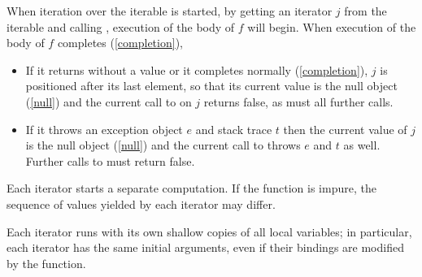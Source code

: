 \documentclass[makeidx]{article}
\begin{document}
\LMHash{}%
When iteration over the iterable is started, by getting an iterator $j$ from the iterable and calling , execution of the body of $f$ will begin.
When execution of the body of $f$ completes (\ref{completion}),
\begin{itemize}
\item If it returns without a value or it completes normally (\ref{completion}), $j$ is positioned after its last element, so that its current value is the null object (\ref{null}) and the current call to  on $j$ returns false, as must all further calls.
\item If it throws an exception object $e$ and stack trace $t$ then the current value of $j$ is the null object (\ref{null}) and the current call to  throws $e$ and $t$ as well.
Further calls to  must return false.
\end{itemize}

Each iterator starts a separate computation.
If the \code{\SYNC*} function is impure, the sequence of values yielded by each iterator may differ.


\LMHash{}%
Each iterator runs with its own shallow copies of all local variables; in particular, each iterator has the same initial arguments, even if their bindings are modified by the function.
\end{document}
